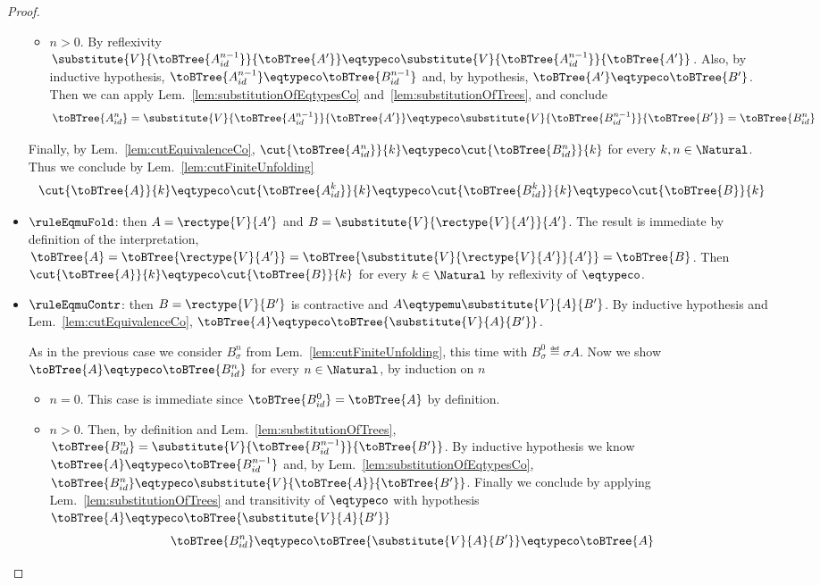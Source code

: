 \begin{proof}
\begin{itemize}
\begin{itemize}
    \item $n > 0$. By reflexivity
    $\substitute{V}{\toBTree{A_{id}^{n-1}}}{\toBTree{A'}} \eqtypeco
    \substitute{V}{\toBTree{A_{id}^{n-1}}}{\toBTree{A'}}$. Also, by inductive
    hypothesis, $\toBTree{A_{id}^{n-1}} \eqtypeco \toBTree{B_{id}^{n-1}}$ and,
    by hypothesis, $\toBTree{A'} \eqtypeco \toBTree{B'}$. Then we can apply
    Lem.~\ref{lem:substitutionOfEqtypesCo} and~\ref{lem:substitutionOfTrees},
    and conclude $$\toBTree{A_{id}^n} =
    \substitute{V}{\toBTree{A_{id}^{n-1}}}{\toBTree{A'}} \eqtypeco
    \substitute{V}{\toBTree{B_{id}^{n-1}}}{\toBTree{B'}} = \toBTree{B_{id}^n}$$
  \end{itemize}
  
  Finally, by Lem.~\ref{lem:cutEquivalenceCo}, $\cut{\toBTree{A_{id}^n}}{k}
  \eqtypeco \cut{\toBTree{B_{id}^n}}{k}$ for every $k, n \in \Natural$. Thus we
  conclude by Lem.~\ref{lem:cutFiniteUnfolding} $$\cut{\toBTree{A}}{k}
  \eqtypeco \cut{\toBTree{A_{id}^k}}{k} \eqtypeco \cut{\toBTree{B_{id}^k}}{k}
  \eqtypeco \cut{\toBTree{B}}{k}$$
  
  \item $\ruleEqmuFold$: then $A = \rectype{V}{A'}$ and $B =
  \substitute{V}{\rectype{V}{A'}}{A'}$. The result is immediate by definition
  of the interpretation, $\toBTree{A} = \toBTree{\rectype{V}{A'}} =
  \toBTree{\substitute{V}{\rectype{V}{A'}}{A'}} = \toBTree{B}$. Then
  $\cut{\toBTree{A}}{k} \eqtypeco \cut{\toBTree{B}}{k}$ for every $k \in
  \Natural$ by reflexivity of $\eqtypeco$.
  
  \item $\ruleEqmuContr$: then $B = \rectype{V}{B'}$ is contractive and $A
  \eqtypemu \substitute{V}{A}{B'}$. By inductive hypothesis and
  Lem.~\ref{lem:cutEquivalenceCo}, $\toBTree{A} \eqtypeco
  \toBTree{\substitute{V}{A}{B'}}$.
  
  As in the previous case we consider $B_\sigma^n$ from
  Lem.~\ref{lem:cutFiniteUnfolding}, this time with $B_\sigma^0 \eqdef \sigma
  A$. Now we show $\toBTree{A} \eqtypeco \toBTree{B_{id}^n}$ for every $n \in
  \Natural$, by induction on $n$
  
  \begin{itemize}
    \item $n = 0$. This case is immediate since $\toBTree{B_{id}^0} =
    \toBTree{A}$ by definition.
    
    \item $n > 0$. Then, by definition and Lem.~\ref{lem:substitutionOfTrees},
    $\toBTree{B_{id}^n} =
    \substitute{V}{\toBTree{B_{id}^{n-1}}}{\toBTree{B'}}$. By inductive
    hypothesis we know $\toBTree{A} \eqtypeco \toBTree{B_{id}^{n-1}}$ and, by
    Lem.~\ref{lem:substitutionOfEqtypesCo}, $\toBTree{B_{id}^n} \eqtypeco
    \substitute{V}{\toBTree{A}}{\toBTree{B'}}$. Finally we conclude by applying
    Lem.~\ref{lem:substitutionOfTrees} and transitivity of $\eqtypeco$ with
    hypothesis $\toBTree{A} \eqtypeco \toBTree{\substitute{V}{A}{B'}}$
    $$\toBTree{B_{id}^n} \eqtypeco \toBTree{\substitute{V}{A}{B'}} \eqtypeco
    \toBTree{A}$$
  \end{itemize}
  

\end{itemize}
\end{proof}
